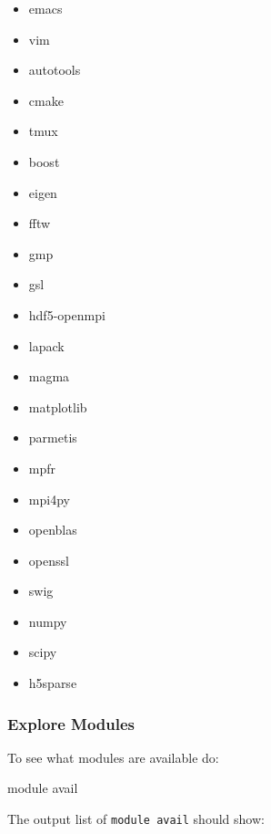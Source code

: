 \documentclass[
]{article}
\providecommand{\tightlist}{%
  \setlength{\itemsep}{0pt}\setlength{\parskip}{0pt}}
\let\oldtexttt\texttt
\renewcommand{\texttt}[1]{
  \colorbox{Light}{\oldtexttt{#1}}
}
\newenvironment{Shaded}{}{}
\newcommand{\ExtensionTok}[1]{#1}
\newcommand{\NormalTok}[1]{#1}
\providecommand{\tightlist}{%
  \setlength{\itemsep}{0pt}\setlength{\parskip}{0pt}}
\begin{document}
\begin{itemize}
\tightlist
\item
  emacs
\item
  vim
\item
  autotools
\item
  cmake
\item
  tmux
\item
  boost
\item
  eigen
\item
  fftw
\item
  gmp
\item
  gsl
\item
  hdf5-openmpi
\item
  lapack
\item
  magma
\item
  matplotlib
\item
  parmetis
\item
  mpfr
\item
  mpi4py
\item
  openblas
\item
  openssl
\item
  swig
\item
  numpy
\item
  scipy
\item
  h5sparse
\end{itemize}

\hypertarget{explore-modules}{%
\subsubsection{Explore Modules}\label{explore-modules}}

To see what modules are available do:

\begin{Shaded}
\begin{Highlighting}[]
\ExtensionTok{module}\NormalTok{ avail }
\end{Highlighting}
\end{Shaded}

The output list of \texttt{module\ avail} should show:
\end{document}
